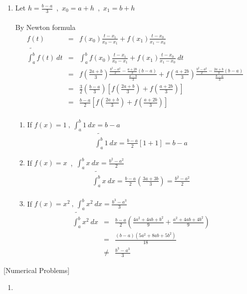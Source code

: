 \documentclass[12pt]{article}
\begin{document}
\begin{enumerate}
	
	\item
	Let $h=\frac{b-a}{3}$~,~$x_0=a+h$~,~$x_1=b+h$\\\\
	By Newton formula\\
	\begin{eqnarray*}
	f(t)&=&f(x_0)\frac{t-x_1}{x_0-x_1}+f(x_1)\frac{t-x_0}{x_1-x_0}\\
	\widetilde{\int_{a}^{b}}f(t)~dt&=&\int_{a}^{b}f(x_0)\frac{t-x_1}{x_0-x_1}+f(x_1)\frac{t-x_0}{x_1-x_0}~dt\\
	&=&f(\frac{2a+b}{3})\frac{\frac{b^2-a^2}{2}-\frac{a+2b}{3}(b-a)}{\frac{a-b}{3}}
	+f(\frac{a+2b}{3})\frac{\frac{b^2-a^2}{2}-\frac{2a+b}{3}(b-a)}{\frac{b-a}{3}}\\
	&=&\frac{3}{2}(\frac{b-a}{3})\left[f\left(\frac{2a+b}{3}\right)+f\left(\frac{a+2b}{3}\right)\right]\\
	&=&\frac{b-a}{2}\left[f\left(\frac{2a+b}{3}\right)+f\left(\frac{a+2b}{3}\right)\right]\\
	\end{eqnarray*}
	\begin{enumerate}[{(1)}]
		\item If $f(x)=1~,~\int_{a}^{b}1~dx=b-a$
			\begin{eqnarray*}
				\widetilde{\int_{a}^{b}}1~dx=\frac{b-a}{2}[1+1]=b-a
			\end{eqnarray*}
		\item If $f(x)=x$~,~$\int_{a}^{b}x~dx=\frac{b^2-a^2}{2}$
			\begin{eqnarray*}
				\widetilde{\int_{a}^{b}}x~dx=\frac{b-a}{2}(\frac{3a+3b}{3})=						\frac{b^2-a^2}{2}\\
			\end{eqnarray*}
		\item If $f(x)=x^2~,~\int_{a}^{b}x^2~dx = \frac{b^3-a^3}{3}$
			\begin{eqnarray*}
				\widetilde{\int_{a}^{b}}x^2~dx &=&\frac{b-a}{2}\left(\frac{4a^2+4ab+b^2}{9}+\frac{a^2+4ab+4b^2}{9}\right)\\
				&=&\frac{(b-a)(5a^2+8ab+5b^2)}{18}\\
				&\neq&\frac{b^3-a^3}{3}
			\end{eqnarray*}
	\end{enumerate}

        
\end{enumerate}

[Numerical Problems]
\begin{enumerate}
    \item
    \lstset{language=Matlab,showstringspaces=false}
	
\end{enumerate}
\end{document}
